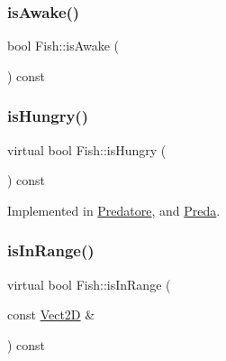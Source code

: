 \mbox{\label{classFish_aea2a66c3cd46d3a672c82ca9e537b9ec_aea2a66c3cd46d3a672c82ca9e537b9ec}} 
\subsubsection{\texorpdfstring{is\+Awake()}{isAwake()}}
{\footnotesize\ttfamily bool Fish\+::is\+Awake (\begin{DoxyParamCaption}{ }\end{DoxyParamCaption}) const}

\mbox{\label{classFish_a5fa8678bf28b723cfd2e225c217bb523_a5fa8678bf28b723cfd2e225c217bb523}} 
\subsubsection{\texorpdfstring{is\+Hungry()}{isHungry()}}
{\footnotesize\ttfamily virtual bool Fish\+::is\+Hungry (\begin{DoxyParamCaption}{ }\end{DoxyParamCaption}) const\hspace{0.3cm}{\ttfamily [pure virtual]}}



Implemented in \hyperlink{classPredatore_a5fee9e39cc20b5f9fe79aee870af852c_a5fee9e39cc20b5f9fe79aee870af852c}{Predatore}, and \hyperlink{classPreda_ae63bc07a928fe4b6685fcdd06c22a506_ae63bc07a928fe4b6685fcdd06c22a506}{Preda}.

\mbox{\label{classFish_a65e3b0bf5b211be6c4048aa5939331e1_a65e3b0bf5b211be6c4048aa5939331e1}} 
\subsubsection{\texorpdfstring{is\+In\+Range()}{isInRange()}}
{\footnotesize\ttfamily virtual bool Fish\+::is\+In\+Range (\begin{DoxyParamCaption}\item[{const \hyperlink{classVect2D}{Vect2D} \&}]{ }\end{DoxyParamCaption}) const\hspace{0.3cm}{\ttfamily [pure virtual]}}



